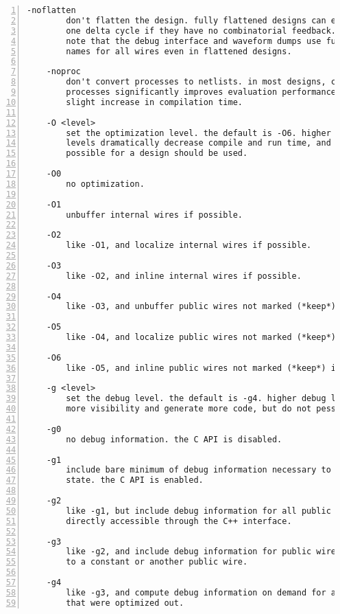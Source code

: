 \begin{lstlisting}[numbers=left,frame=single]
    -noflatten
        don't flatten the design. fully flattened designs can evaluate within
        one delta cycle if they have no combinatorial feedback.
        note that the debug interface and waveform dumps use full hierarchical
        names for all wires even in flattened designs.

    -noproc
        don't convert processes to netlists. in most designs, converting
        processes significantly improves evaluation performance at the cost of
        slight increase in compilation time.

    -O <level>
        set the optimization level. the default is -O6. higher optimization
        levels dramatically decrease compile and run time, and highest level
        possible for a design should be used.

    -O0
        no optimization.

    -O1
        unbuffer internal wires if possible.

    -O2
        like -O1, and localize internal wires if possible.

    -O3
        like -O2, and inline internal wires if possible.

    -O4
        like -O3, and unbuffer public wires not marked (*keep*) if possible.

    -O5
        like -O4, and localize public wires not marked (*keep*) if possible.

    -O6
        like -O5, and inline public wires not marked (*keep*) if possible.

    -g <level>
        set the debug level. the default is -g4. higher debug levels provide
        more visibility and generate more code, but do not pessimize evaluation.

    -g0
        no debug information. the C API is disabled.

    -g1
        include bare minimum of debug information necessary to access all design
        state. the C API is enabled.

    -g2
        like -g1, but include debug information for all public wires that are
        directly accessible through the C++ interface.

    -g3
        like -g2, and include debug information for public wires that are tied
        to a constant or another public wire.

    -g4
        like -g3, and compute debug information on demand for all public wires
        that were optimized out.
\end{lstlisting}

